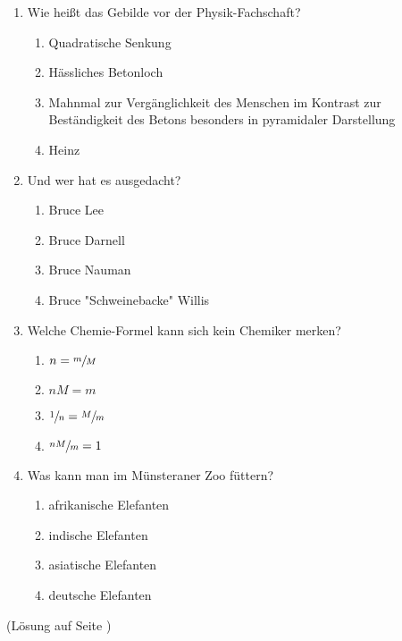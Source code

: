 \begin{multicols}{2}
\begin{enumerate}[font=\large, before=\large]
\item Wie heißt das Gebilde vor der Physik-Fachschaft?
	\begin{enumerate}[label=\alph*), before=\normalsize]
	\item Quadratische Senkung
	\item Hässliches Betonloch
	\item Mahnmal zur Vergänglichkeit des Menschen im Kontrast zur Beständigkeit des Betons besonders in pyramidaler Darstellung
	\item Heinz
\end{enumerate}
\columnbreak
\item Und wer hat es ausgedacht?
	\begin{enumerate}[label=\alph*), before=\normalsize]
	\item Bruce Lee
	\item Bruce Darnell
	\item Bruce Nauman
	\item Bruce "Schweinebacke" Willis
	\end{enumerate}
\item Welche Chemie-Formel kann sich kein Chemiker merken?
	\begin{enumerate}[label=\alph*), before=\normalsize]
	\item $n = \sfrac{m}{M}$
	\item $n M = m$
	\item $\sfrac{1}{n} = \sfrac{M}{m}$
	\item $\sfrac{n M}{m} = 1$
	\end{enumerate}
\item Was kann man im Münsteraner Zoo füttern?
	\begin{enumerate}[label=\alph*), before=\normalsize]
	\item afrikanische Elefanten
	\item indische Elefanten
	\item asiatische Elefanten
	\item deutsche Elefanten
	\end{enumerate}
\end{enumerate}

\hfill(Lösung auf Seite \pageref{rätsel_lösungen})

\begin{center}
\end{center}
\end{multicols}
